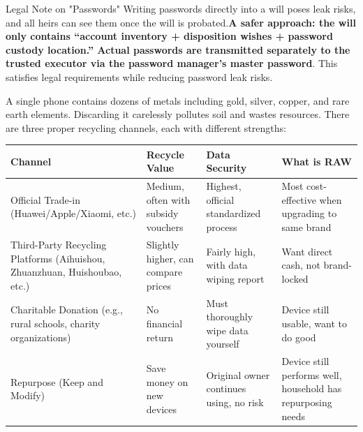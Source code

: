 \begin{tcbwarn}{Legal Note on "Passwords"}
Writing passwords directly into a will poses leak risks, and all heirs can see them once the will is probated.\textbf{A safer approach: the will only contains “account inventory + disposition wishes + password custody location.” Actual passwords are transmitted separately to the trusted executor via the password manager's master password}. This satisfies legal requirements while reducing password leak risks.

\end{tcbwarn}


A single phone contains dozens of metals including gold, silver, copper, and rare earth elements. Discarding it carelessly pollutes soil and wastes resources. There are three proper recycling channels, each with different strengths:

\begin{center}
\begin{tabularx}{\linewidth}{|X|X|X|X|}
\hline
\textbf{Channel} & \textbf{Recycle Value} & \textbf{Data Security} & \textbf{What is RAW} \tabularnewline
\hline
Official Trade-in (Huawei/Apple/Xiaomi, etc.) & Medium, often with subsidy vouchers & Highest, official standardized process & Most cost-effective when upgrading to same brand \tabularnewline
Third-Party Recycling Platforms (Aihuishou, Zhuanzhuan, Huishoubao, etc.) & Slightly higher, can compare prices & Fairly high, with data wiping report & Want direct cash, not brand-locked \tabularnewline
Charitable Donation (e.g., rural schools, charity organizations) & No financial return & Must thoroughly wipe data yourself & Device still usable, want to do good \tabularnewline
Repurpose (Keep and Modify) & Save money on new devices & Original owner continues using, no risk & Device still performs well, household has repurposing needs \tabularnewline
\hline
\end{tabularx}
\end{center}

